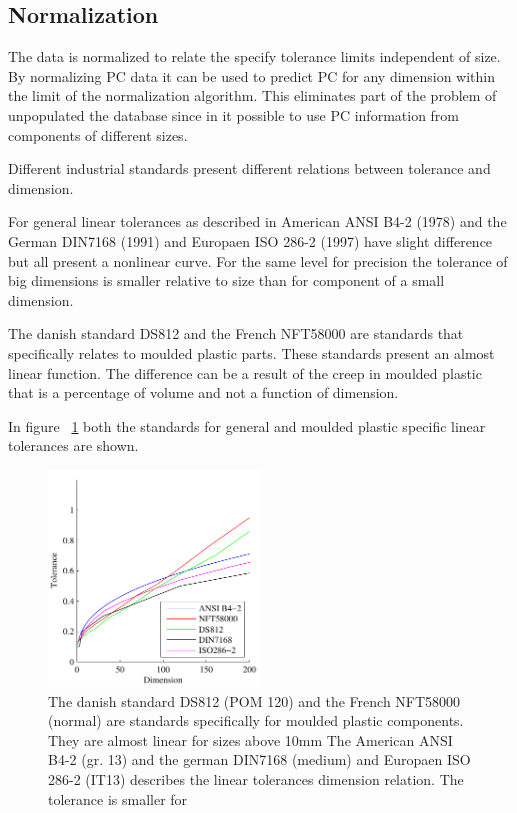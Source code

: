 \documentclass[aip,amsmath, reprint, author-year]{revtex4-1}
\begin{document}
\subsection{Normalization}

The data is normalized to relate the specify tolerance limits independent of size. By normalizing PC data it can be used to predict PC for any dimension within the limit of the normalization algorithm. 
This eliminates part of the problem of unpopulated the database since in it possible to use PC information from components of different sizes.

Different industrial standards present different relations between tolerance and dimension. 

For general linear tolerances as described in American ANSI B4-2 (1978) and the German DIN7168 (1991) and Europaen ISO 286-2 (1997) have slight difference but all present a nonlinear curve. For the same level for precision the tolerance of big dimensions is smaller relative to size than for component of a small dimension.

The danish standard DS812 and the French NFT58000 are standards that specifically relates to moulded plastic parts. These standards present an almost linear function. The difference can be a result of the creep in moulded plastic that is a percentage of volume and not a function of dimension.

In figure ~\ref{fig:tolstd} both the standards for general and moulded plastic specific linear tolerances are shown.

\begin{figure}
\includegraphics[width=0.5\textwidth]{Tolerance_standards.pdf}
\caption{\label{fig:tolstd} The danish standard DS812 (POM 120) and the French NFT58000 (normal) are standards specifically for moulded plastic components. They are almost linear for sizes above 10mm The American ANSI B4-2 (gr. 13) and the german DIN7168 (medium) and Europaen ISO 286-2 (IT13) describes the linear tolerances dimension relation. The tolerance is smaller for }
\end{figure}
\end{document}
